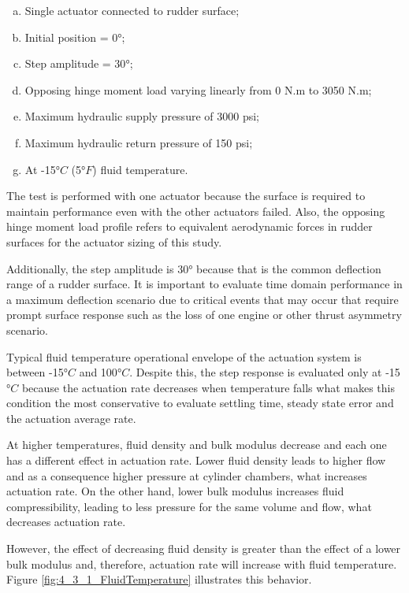 \begin{enumerate}[a)]
	\item Single actuator connected to rudder surface;	
	\item Initial position = 0$°$;
	\item Step amplitude = 30$°$;	
	\item Opposing hinge moment load varying linearly from 0 N.m to 3050 N.m;	
	\item Maximum hydraulic supply pressure of 3000 psi;
	\item Maximum hydraulic return pressure of 150 psi;	
	\item At -15$°C$ (5$°F$) fluid temperature.
\end{enumerate}

The test is performed with one actuator because the surface is required to maintain performance even with the other actuators failed. Also, the opposing hinge moment load profile refers to equivalent aerodynamic forces in rudder surfaces for the actuator sizing of this study. 

Additionally, the step amplitude is 30$°$ because that is the common deflection range of a rudder surface. It is important to evaluate time domain performance in a maximum deflection scenario due to critical events that may occur that require prompt surface response such as the loss of one engine or other thrust asymmetry scenario.

Typical fluid temperature operational envelope of the actuation system is between -15$°C$ and 100$°C$. Despite this, the step response is evaluated only at -15$°C$ because the actuation rate decreases when temperature falls what makes this condition the most conservative to evaluate settling time, steady state error and the actuation average rate.

At higher temperatures, fluid density and bulk modulus decrease and each one has a different effect in actuation rate. Lower fluid density leads to higher flow and as a consequence higher pressure at cylinder chambers, what increases actuation rate. On the other hand, lower bulk modulus increases fluid compressibility, leading to less pressure for the same volume and flow, what decreases actuation rate. 

However, the effect of decreasing fluid density is greater than the effect of a lower bulk modulus and, therefore, actuation rate will increase with fluid temperature. Figure \ref{fig:4_3_1_FluidTemperature} illustrates this behavior.


